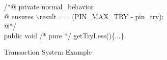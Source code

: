 \begin{figure}[h]
\begin{multicols}{2}
\begin{scriptsize}
 /*@ private  normal\_behavior\\
\quad  @ ensures $\backslash$result ==  (PIN\_MAX\_TRY - pin\_try);\\
\quad         @*/\\
public void /* pure */ getTryLess()\{...\}
          

\normalfont
\setlength{\parindent}{1cm}
\end{scriptsize}
\end{multicols}
\caption{Transaction System Example}
\label{FigRunningExample}


\end{figure}






